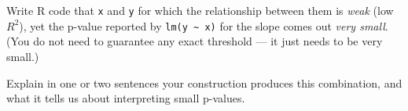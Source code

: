 \question[12]{}

Write R code that  \verb|x| and \verb|y| for which the relationship between them is \emph{weak} (low $R^2$), yet the p-value reported by \verb|lm(y ~ x)| for the slope comes out \emph{very small}. (You do not need to guarantee any exact threshold --- it just needs to be very small.)

Explain in one or two sentences  your construction produces this combination, and what it tells us about interpreting small p-values.

\ifanswerspace
\vfillstretch
\fi

